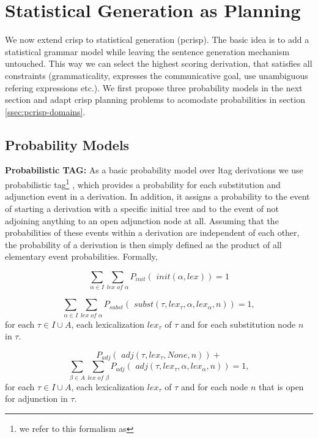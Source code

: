\section{Statistical Generation as Planning}
\label{sec:pcrisp}

We now extend {\sc crisp} to statistical generation ({\sc pcrisp}). The basic idea is to add a statistical grammar model while leaving the sentence generation mechanism untouched. This way we can select the highest scoring derivation, that satisfies all constraints (grammaticality, expresses the communicative goal, use unambiguous refering expressions etc.). We first propose three probability models in the next section and adapt {\sc crisp} planning problems to acomodate probabilities in section \ref{ssec:pcrisp-domains}.

\subsection{Probability Models}
\label{ssec:probmodels}

{\bf Probabilistic TAG:}
As a basic probability model over {\sc ltag} derivations we use probabilistic {\sc tag}\footnote{we refer to this formalism as } \cite{resnik1992}, 
which provides a probability for each substitution and adjunction event in a derivation. In addition, it assigns a probability to the event of starting a derivation with a specific initial tree and to the event of not adjoining anything to an open adjunction node at all. Assuming that the probabilities of these events within a derivation are independent of each other, the probability of a derivation is then simply defined as the product of all elementary event probabilities.
Formally,

\newcommand{\adj}[0]{\textit{ adj}}
\newcommand{\init}[0]{\textit{ init}}
\newcommand{\subst}[0]{\textit{ subst}}
$$ \sum\limits_{\alpha \in I}\sum\limits_{lex \textit{ of } \alpha} P_{init}(\init(\alpha, lex)) = 1 $$

$$\sum\limits_{\alpha \in I}\sum\limits_{lex \textit{ of }\alpha} P_{subst}(\subst(\tau,lex_\tau, \alpha, lex_\alpha, n)) = 1,$$
for each $\tau \in I \cup A$, each lexicalization $lex_\tau$  of $\tau$ and for each substitution node $n$ in $\tau$.

$$ P_{adj}(\adj(\tau, lex_\tau, \textit{None},n)) +$$
$$ \sum\limits_{\beta \in A}\sum\limits_{lex \textit{ of }\beta} P_{adj}(\adj(\tau,lex_\tau, \alpha, lex_\alpha, n)) = 1,$$ for each $\tau \in I \cup A$, each lexicalization $lex_\tau$  of $\tau$ and for each node $n$ that is open for adjunction in $\tau$.



